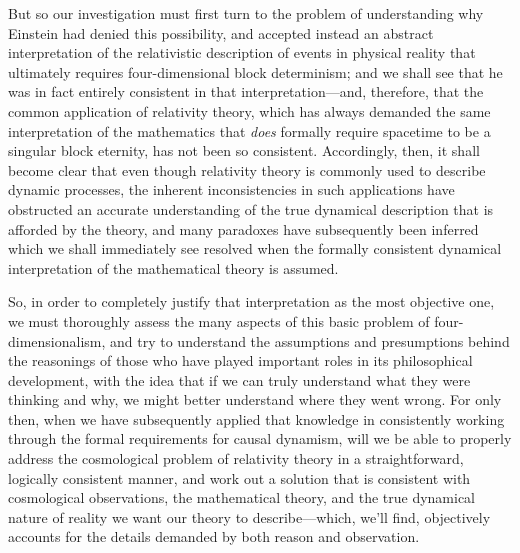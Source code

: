 But so our investigation must first turn to the problem of understanding why Einstein had denied this possibility, and accepted instead an abstract interpretation of the relativistic description of events in physical reality that ultimately requires four-dimensional block determinism; and we shall see that he was in fact entirely consistent in that interpretation---and, therefore, that the common application of relativity theory, which has always demanded the same interpretation of the mathematics that \textit{does} formally require spacetime to be a singular block eternity, has not been so consistent. Accordingly, then, it shall become clear that even though relativity theory is commonly used to describe dynamic processes, the inherent inconsistencies in such applications have obstructed an accurate understanding of the true dynamical description that is afforded by the theory, and many paradoxes have subsequently been inferred which we shall immediately see resolved when the formally consistent dynamical interpretation of the mathematical theory is assumed.

So, in order to completely justify that interpretation as the most objective one, we must thoroughly assess the many aspects of this basic problem of four-dimensionalism, and try to understand the assumptions and presumptions behind the reasonings of those who have played important roles in its philosophical development, with the idea that if we can truly understand what they were thinking and why, we might better understand where they went wrong. For only then, when we have subsequently applied that knowledge in consistently working through the formal requirements for causal dynamism, will we be able to properly address the cosmological problem of relativity theory in a straightforward, logically consistent manner, and work out a solution that is consistent with cosmological observations, the mathematical theory, and the true dynamical nature of reality we want our theory to describe---which, we'll find, objectively accounts for the details demanded by both reason and observation.